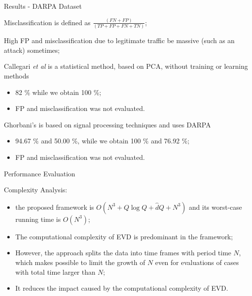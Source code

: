 \documentclass[newPxFont, numfooter, sectionpages]{beamer}
\begin{document}
\begin{frame}{Results - DARPA Dataset}
	
	Misclassification is defined as $\frac{(FN+FP)}{(TP+FP+FN+TN)}$;

	High FP and misclassification due to legitimate traffic be massive (such as an attack) sometimes;

	Callegari \emph{et al} is a statistical method, based on PCA, without training or learning methods
	\begin{itemize}
		\item 82 \% while we obtain 100 \%;
		\item FP and misclassification was not evaluated.
	\end{itemize}

	Ghorbani's is based on signal processing techniques and uses DARPA
	\begin{itemize}
		\item 94.67 \% and 50.00 \%, while we obtain 100 \% and 76.92 \%;
		\item FP and misclassification was not evaluated.
	\end{itemize}

\end{frame}
\begin{frame}{Performance Evaluation}

	Complexity Analysis:
	\begin{itemize}
		\item the proposed framework is $O(N^3 + Q \log Q + \hat{d}Q + N^3)$ and its worst-case running time is $O(N^3)$;
		\item The computational complexity of EVD is predominant in the framework;
		\item However, the approach splits the data into time frames with period time $N$, which makes possible to limit the growth of $N$ even for evaluations of cases with total time larger than $N$;
		\item It reduces the impact caused by the computational complexity of EVD.
	\end{itemize}
	
\end{frame}
\end{document}
